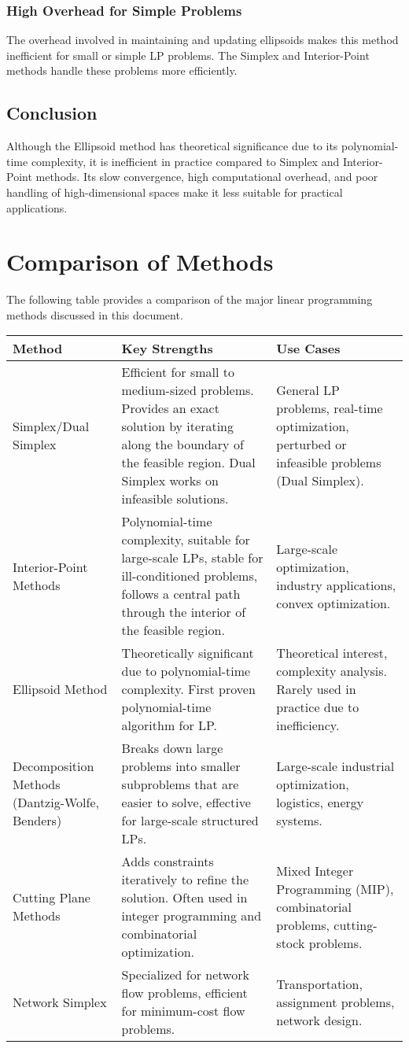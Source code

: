 \documentclass{article}
\begin{document}
\subsubsection{High Overhead for Simple Problems}
The overhead involved in maintaining and updating ellipsoids makes this method inefficient for small or simple LP problems. The Simplex and Interior-Point methods handle these problems more efficiently.

\subsection{Conclusion}
Although the Ellipsoid method has theoretical significance due to its polynomial-time complexity, it is inefficient in practice compared to Simplex and Interior-Point methods. Its slow convergence, high computational overhead, and poor handling of high-dimensional spaces make it less suitable for practical applications.

\section{Comparison of Methods}
The following table provides a comparison of the major linear programming methods discussed in this document.

\begin{longtable}{|p{3.5cm}|p{5cm}|p{5cm}|}
\hline
\textbf{Method} & \textbf{Key Strengths} & \textbf{Use Cases} \\
\hline
Simplex/Dual Simplex & Efficient for small to medium-sized problems. Provides an exact solution by iterating along the boundary of the feasible region. Dual Simplex works on infeasible solutions. & General LP problems, real-time optimization, perturbed or infeasible problems (Dual Simplex). \\
\hline
Interior-Point Methods & Polynomial-time complexity, suitable for large-scale LPs, stable for ill-conditioned problems, follows a central path through the interior of the feasible region. & Large-scale optimization, industry applications, convex optimization. \\
\hline
Ellipsoid Method & Theoretically significant due to polynomial-time complexity. First proven polynomial-time algorithm for LP. & Theoretical interest, complexity analysis. Rarely used in practice due to inefficiency. \\
\hline
Decomposition Methods (Dantzig-Wolfe, Benders) & Breaks down large problems into smaller subproblems that are easier to solve, effective for large-scale structured LPs. & Large-scale industrial optimization, logistics, energy systems. \\
\hline
Cutting Plane Methods & Adds constraints iteratively to refine the solution. Often used in integer programming and combinatorial optimization. & Mixed Integer Programming (MIP), combinatorial problems, cutting-stock problems. \\
\hline
Network Simplex & Specialized for network flow problems, efficient for minimum-cost flow problems. & Transportation, assignment problems, network design. \\
\hline
\end{longtable}
\end{document}
